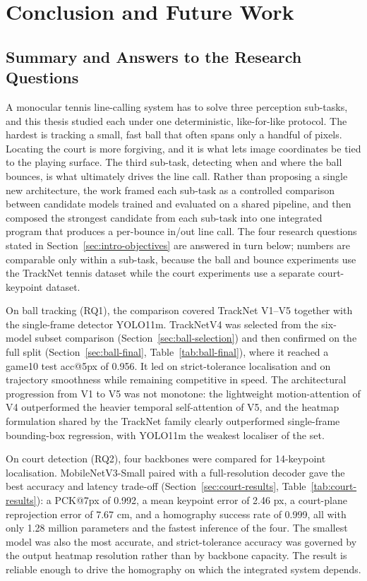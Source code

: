 \chapter{Conclusion and Future Work}
\label{ch:conclusion}

\section{Summary and Answers to the Research Questions}
\label{sec:concl-summary}

A monocular tennis line-calling system has to solve three perception sub-tasks, and this thesis studied each under one deterministic, like-for-like protocol. The hardest is tracking a small, fast ball that often spans only a handful of pixels. Locating the court is more forgiving, and it is what lets image coordinates be tied to the playing surface. The third sub-task, detecting when and where the ball bounces, is what ultimately drives the line call. Rather than proposing a single new architecture, the work framed each sub-task as a controlled comparison between candidate models trained and evaluated on a shared pipeline, and then composed the strongest candidate from each sub-task into one integrated program that produces a per-bounce in/out line call. The four research questions stated in Section~\ref{sec:intro-objectives} are answered in turn below; numbers are comparable only within a sub-task, because the ball and bounce experiments use the TrackNet tennis dataset while the court experiments use a separate court-keypoint dataset.

On ball tracking (RQ1), the comparison covered TrackNet V1--V5 together with the single-frame detector YOLO11m. TrackNetV4 was selected from the six-model subset comparison (Section~\ref{sec:ball-selection}) and then confirmed on the full split (Section~\ref{sec:ball-final}, Table~\ref{tab:ball-final}), where it reached a game10 test acc@5px of 0.956. It led on strict-tolerance localisation and on trajectory smoothness while remaining competitive in speed. The architectural progression from V1 to V5 was not monotone: the lightweight motion-attention of V4 outperformed the heavier temporal self-attention of V5, and the heatmap formulation shared by the TrackNet family clearly outperformed single-frame bounding-box regression, with YOLO11m the weakest localiser of the set.

On court detection (RQ2), four backbones were compared for 14-keypoint localisation. MobileNetV3-Small paired with a full-resolution decoder gave the best accuracy and latency trade-off (Section~\ref{sec:court-results}, Table~\ref{tab:court-results}): a PCK@7px of 0.992, a mean keypoint error of 2.46 px, a court-plane reprojection error of 7.67 cm, and a homography success rate of 0.999, all with only 1.28 million parameters and the fastest inference of the four. The smallest model was also the most accurate, and strict-tolerance accuracy was governed by the output heatmap resolution rather than by backbone capacity. The result is reliable enough to drive the homography on which the integrated system depends.

